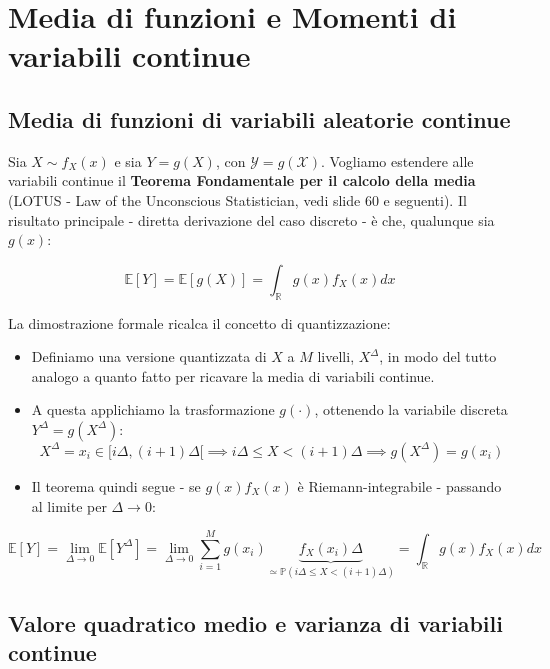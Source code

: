 \section{Media di funzioni e Momenti di variabili continue}

\subsection{Media di funzioni di variabili aleatorie continue}

Sia $X \sim f_X(x)$ e sia $Y = g(X)$, con $\mathcal{Y} = g(\mathcal{X})$. Vogliamo estendere alle variabili continue il \textbf{Teorema Fondamentale per il calcolo della media} (LOTUS - Law of the Unconscious Statistician, vedi slide 60 e seguenti).
Il risultato principale - diretta derivazione del caso discreto - è che, qualunque sia $g(x)$:

\begin{equation}
\mathbb{E}[Y] = \mathbb{E}[g(X)] = \int_{\mathbb{R}} g(x)f_X(x) dx
\end{equation}

La dimostrazione formale ricalca il concetto di quantizzazione:
\begin{itemize}
    \item Definiamo una versione quantizzata di $X$ a $M$ livelli, $X^\Delta$, in modo del tutto analogo a quanto fatto per ricavare la media di variabili continue.
    \item A questa applichiamo la trasformazione $g(\cdot)$, ottenendo la variabile discreta $Y^\Delta = g(X^\Delta)$:
    \[ X^\Delta = x_i \in [i\Delta, (i+1)\Delta[ \implies i\Delta \le X < (i+1)\Delta \implies g(X^\Delta) = g(x_i) \]
    \item Il teorema quindi segue - se $g(x)f_X(x)$ è Riemann-integrabile - passando al limite per $\Delta \to 0$:
\end{itemize}

\begin{equation}
\mathbb{E}[Y] = \lim_{\Delta \to 0} \mathbb{E}[Y^\Delta] = \lim_{\Delta \to 0} \sum_{i=1}^{M} g(x_i) \underbrace{f_X(x_i)\Delta}_{\simeq \mathbb{P}(i\Delta \le X < (i+1)\Delta)} = \int_{\mathbb{R}} g(x)f_X(x) dx
\end{equation}

\subsection{Valore quadratico medio e varianza di variabili continue}


